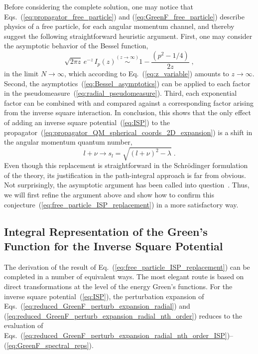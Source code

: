 \documentclass[a4paper,preprint,draft,showpacs,amsmath,amsfonts,amssymb,aps,prd]{revtex4}%
\begin{document}
Before considering the 
complete solution, 
one may notice that 
Eqs.~(\ref{eq:propagator_free_particle}) and (\ref{eq:GreenF_free_particle})
describe physics of a free particle, for each angular momentum channel,
and thereby suggest the following straightforward heuristic argument.
First,   
one may consider 
  the asymptotic
behavior of the Bessel function,
\begin{equation} 
\sqrt{2 \pi z} \,
e^{-z}
\,
 I_{p}(z) \stackrel{(z \rightarrow \infty)}{\sim} 
1 - \frac{(p^{2} -1/4)}{2z}
\; ,
\label{eq:Bessel_asymptotics}
\end{equation}
in the limit
$N \rightarrow \infty$,
which according to Eq.~(\ref{eq:z_variable}) amounts to $z \rightarrow \infty$.
Second, 
the asymptotics~(\ref{eq:Bessel_asymptotics}) can be applied 
to each factor in the pseudomeasure~(\ref{eq:radial_pseudomeasure}).
Third, each exponential factor can be combined with and compared against a corresponding 
factor arising from the inverse square interaction.
In conclusion,
this
shows that the only effect of adding an inverse square potential~(\ref{eq:ISP}) 
to the propagator~(\ref{eq:propagator_QM_spherical_coords_2D_expansion})
is a shift in the angular momentum quantum number,
\begin{equation}
l+ \nu \rightarrow s_{l}
=\sqrt{ (l+\nu)^{2} - \lambda}
\;  .
\label{eq:free_particle_ISP_replacement}
\end{equation}
Even though this replacement is straightforward in the 
Schr\"{o}dinger formulation of the theory,
its justification in the path-integral approach 
is far from obvious. Not surprisingly,
the asymptotic argument has been called into 
question~\cite{kleinert}. Thus, 
 we will first refine the argument above and 
show how to confirm this conjecture~(\ref{eq:free_particle_ISP_replacement})
in a more satisfactory way.


\subsection{Integral Representation of the Green's Function for the Inverse Square Potential} 
\label{sec:integral_representation_ISP}


The derivation of the result of Eq.~(\ref{eq:free_particle_ISP_replacement})
can be completed in a number of equivalent ways. The 
most elegant route is based on direct transformations at the level of the
 energy Green's functions. 
For the inverse square potential~(\ref{eq:ISP}),
the perturbation expansion of Eqs.~(\ref{eq:reduced_GreenF_perturb_expansion_radial})
and (\ref{eq:reduced_GreenF_perturb_expansion_radial_nth_order})
reduces to the evaluation of 
Eqs.~(\ref{eq:reduced_GreenF_perturb_expansion_radial_nth_order_ISP})--(\ref{eq:GreenF_spectral_reps}).
\end{document}
